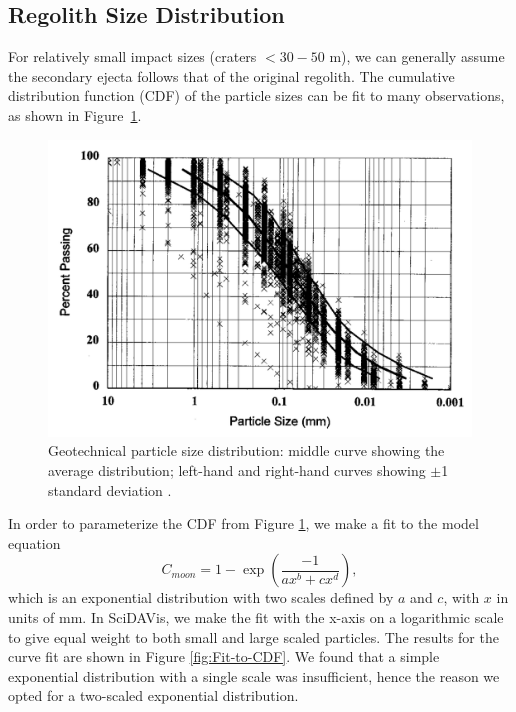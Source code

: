 \documentclass{hitec}
\numberwithin{equation}{section}
\begin{document}
\subsection{Regolith Size Distribution}
For relatively small impact sizes (craters $<30-50$ m), we can generally assume the secondary ejecta follows that of the original regolith. The cumulative distribution function (CDF) of the particle sizes can be fit to many observations, as shown in Figure~\ref{fig:Carrier2003_Fig1_particle-size-distribution}.

\begin{figure}[h!]
	\centering
	\includegraphics[scale=0.4]{Carrier2003_Fig1_particle-size-distribution.PNG}
	\caption{Geotechnical particle size distribution: middle curve showing the average distribution; left-hand and right-hand curves showing $\pm$1 standard deviation \citep{carrier2003particle}.}\label{fig:Carrier2003_Fig1_particle-size-distribution}
\end{figure}

In order to parameterize the CDF from Figure \ref{fig:Carrier2003_Fig1_particle-size-distribution}, we make a fit to the model equation
\begin{equation}\label{eq:particle-CDF}
C_{moon} = 1 - \exp\left(\frac{-1}{ax^b+cx^d}\right),
\end{equation}
which is an exponential distribution with two scales defined by $a$ and $c$, with $x$ in units of mm. In \textsf{SciDAVis}, we make the fit with the x-axis on a logarithmic scale to give equal weight to both small and large scaled particles. The results for the curve fit are shown in Figure \ref{fig:Fit-to-CDF}. We found that a simple exponential distribution with a single scale was insufficient, hence the reason we opted for a two-scaled exponential distribution.
\end{document}
